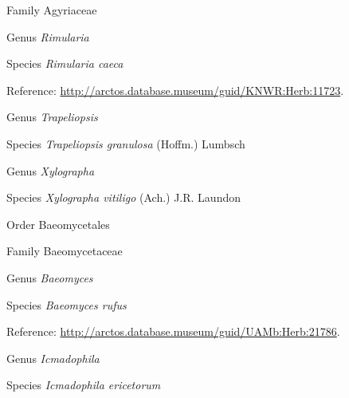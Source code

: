 \documentclass[9pt, article]{memoir}
\begin{document}
\begin{multicols}{2}
\vspace{6pt}\noindent\hspace{24pt}Family Agyriaceae


\vspace{6pt}\noindent\hspace{30pt}Genus \textit{Rimularia}


\vspace{6pt}\noindent\hspace{36pt}Species \textit{Rimularia caeca}


\vspace{6pt}Reference: 
\url{http://arctos.database.museum/guid/KNWR:Herb:11723}.

\vspace{6pt}\noindent\hspace{30pt}Genus \textit{Trapeliopsis}


\vspace{6pt}\noindent\hspace{36pt}Species \textit{Trapeliopsis granulosa} (Hoffm.) Lumbsch


\vspace{6pt}\noindent\hspace{30pt}Genus \textit{Xylographa}


\vspace{6pt}\noindent\hspace{36pt}Species \textit{Xylographa vitiligo} (Ach.) J.R. Laundon


\vspace{6pt}\noindent\hspace{18pt}Order Baeomycetales


\vspace{6pt}\noindent\hspace{24pt}Family Baeomycetaceae


\vspace{6pt}\noindent\hspace{30pt}Genus \textit{Baeomyces}


\vspace{6pt}\noindent\hspace{36pt}Species \textit{Baeomyces rufus}


\vspace{6pt}Reference: 
\url{http://arctos.database.museum/guid/UAMb:Herb:21786}.

\vspace{6pt}\noindent\hspace{30pt}Genus \textit{Icmadophila}


\vspace{6pt}\noindent\hspace{36pt}Species \textit{Icmadophila ericetorum}



\end{multicols}
\end{document}
